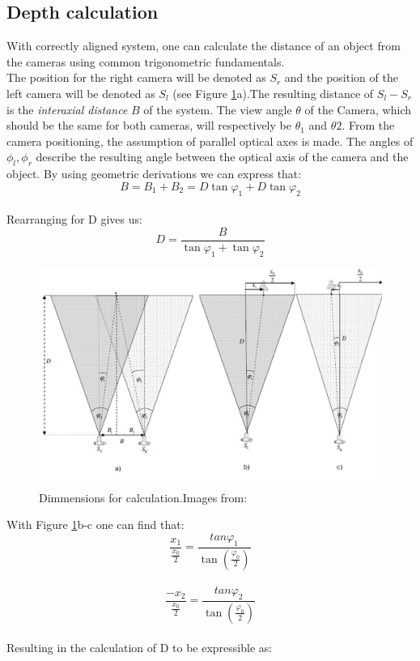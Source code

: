 \subsection{Depth calculation}
With correctly aligned system, one can calculate the distance of an object from the cameras using common trigonometric fundamentals\cite{JernejMrovlje.2008,YasirDawoodSalman.2017}.
\\
The position for the right camera will be denoted as $S_{r}$ and the position of the left camera will be denoted as $S_{l}$ (see Figure \ref{stereo_Dimmensions}a).The resulting distance of $S_{l}-S_{r}$ is the \textit{interaxial distance} $B$ of the system. The view angle $\theta$ of the Camera, which should be the same for both cameras, will respectively be $\theta_{1}$ and $\theta{2}$. From the camera positioning, the assumption of parallel optical axes is made. The angles of $\phi_{l},\phi_{r}$ describe the resulting angle between the optical axis of the camera and the object.
By using geometric derivations we can express that:\\
\begin{equation}
B= B_{1}+B_{2}=D\tan\varphi_{1}+D\tan\varphi_{2}
\end{equation}\\
Rearranging for D gives us:\\
\begin{equation}
D = \frac{B}{\tan\varphi_{1}+\tan\varphi_{2}}
\end{equation}
\begin{figure}[H]
\includegraphics[width=\textwidth]{images/Stereo_Calc_4.JPG}
\caption{Dimmensions for calculation.Images from:\cite{JernejMrovlje.2008}}
\label{stereo_Dimmensions} 
\end{figure}
With Figure \ref{stereo_Dimmensions}b-c one can find that:
\begin{equation}
\frac{x_{1}}{\frac{x_{0}}{2}}=\frac{tan \varphi_1}{\tan(\frac{\varphi_{0}}{2})}
\end{equation}\\
\begin{equation}
\frac{-x_{2}}{\frac{x_{0}}{2}}=\frac{tan \varphi_2}{\tan(\frac{\varphi_{0}}{2})}
\end{equation}\\
Resulting in the calculation of D to be expressible as:

